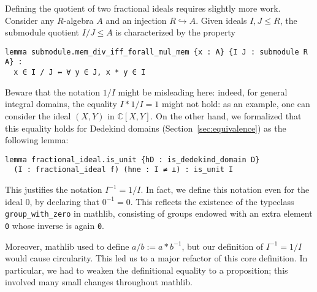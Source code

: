 \documentclass[a4paper,USenglish,cleveref, autoref, thm-restate]{lipics-v2021}
\newcommand{\C}{\mathbb{C}}
\newcommand{\lean}[1]{\texttt{#1}\xspace} %
\newcommand{\mathlib}{\textsf{mathlib}\xspace}
\begin{document}
Defining the quotient of two fractional ideals requires slightly more work. Consider any $R$-algebra $A$ and an injection $R\hookrightarrow A$. Given ideals $I,J\le R$, the submodule quotient $I / J\le A$ %
is characterized by the property
\begin{lstlisting}
lemma submodule.mem_div_iff_forall_mul_mem {x : A} {I J : submodule R A} :
  x ∈ I / J ↔ ∀ y ∈ J, x * y ∈ I
\end{lstlisting}
Beware that the notation $1/I$ might be misleading here: indeed, for general integral domains, the equality $I\ast 1/I=1$ might not hold: as an example, one can consider the ideal $(X,Y)$ in $\C[X,Y]$. 
On the other hand, we formalized that this equality holds for Dedekind domains (Section~\ref{sec:equivalence}) as the following lemma:
\begin{lstlisting}
lemma fractional_ideal.is_unit {hD : is_dedekind_domain D}
  (I : fractional_ideal f) (hne : I ≠ ⊥) : is_unit I
\end{lstlisting}
This justifies the notation $I^{-1}=1/I$. In fact, we define this notation even for the ideal $0$, by declaring that $0^{-1}=0$. This reflects the existence of the typeclass \lean{group\_with\_zero} in \mathlib, consisting of groups endowed with an extra element \lean{0} whose inverse is again \lean{0}. %

Moreover, \mathlib used to define \lean{$a / b := a * b^{-1}$}, but our definition of $I^{-1} = 1 / I$ would cause circularity. This led us to a major refactor of this core definition. In particular, we had to weaken the definitional equality to a proposition; this involved many small changes throughout \mathlib.
\end{document}
